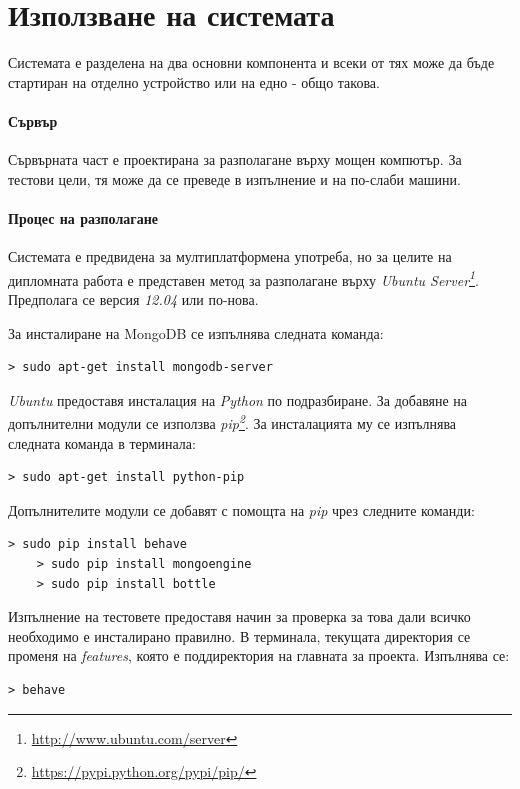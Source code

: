 \chapter{Използване на системата}
	
	Системата е разделена на два основни компонента и всеки от тях може да бъде стартиран на отделно устройство или на едно - общо такова.
	
	\subsubsection{Сървър}
	
	Сървърната част е проектирана за разполагане върху мощен компютър. За тестови цели, тя може да се преведе в изпълнение и на по-слаби машини.
	
	\subsubsection{Процес на разполагане}
	
	Системата е предвидена за мултиплатформена употреба, но за целите на дипломната работа е представен метод за разполагане върху \emph{Ubuntu Server\footnote{\url{http://www.ubuntu.com/server}}}. Предполага се версия \emph{12.04} или по-нова.
	
	За инсталиране на MongoDB се изпълнява следната команда:
	\begin{lstlisting}[style=BashStyle]
    > sudo apt-get install mongodb-server
	\end{lstlisting}
	
	\emph{Ubuntu} предоставя инсталация на \emph{Python} по подразбиране. За добавяне на допълнителни модули се използва \emph{pip\footnote{\url{https://pypi.python.org/pypi/pip/}}}. За инсталацията му се изпълнява следната команда в терминала:
	\begin{lstlisting}[style=BashStyle]
    > sudo apt-get install python-pip
	\end{lstlisting}

	Допълнителите модули се добавят с помощта на \emph{pip} чрез следните команди:
	\begin{lstlisting}[style=BashStyle]
    > sudo pip install behave
    > sudo pip install mongoengine
    > sudo pip install bottle
	\end{lstlisting}

	Изпълнение на тестовете предоставя начин за проверка за това дали всичко необходимо е инсталирано правилно. В терминала, текущата директория се променя на \emph{features}, която е поддиректория на главната за проекта. Изпълнява се:
	\begin{lstlisting}[style=BashStyle]
    > behave
	\end{lstlisting}		
	
